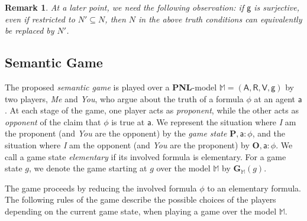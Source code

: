 \documentclass{easychair}
\newcommand{\I}{\emph{I}\xspace}
\newcommand{\You}{\emph{You}\xspace}
\newcommand{\Me}{\emph{Me}\xspace}
\newcommand{\M}{\mathbb{M}}
\newcommand{\A}{\mathsf{A}}
\newcommand{\R}{\mathsf{R}}
\newcommand{\V}{\mathsf{V}}
\newcommand{\g}{\mathsf{g}}
\newcommand{\ag}{\mathsf{a}}
\newtheorem{remark}{Remark}
\newcommand{\PNL}{\textbf{PNL}}
\begin{document}
\begin{remark}\label{rem:surjg}
At a later point, we need the following observation: if $\g$ is surjective, even
if restricted to $N'\subseteq N$, then  $N$ in the above truth conditions
can equivalently be replaced by $N'$. \end{remark}

 

\subsection{Semantic Game}\label{sec:game-semantics}
The proposed \emph{semantic game} is played over a \PNL-model $\M=(\A,\R,\V,\g)$ by two
players, \Me and \You, who argue about the truth of a formula $\phi$ at an
agent $\ag$. At each stage of the game, one player acts as \emph{proponent}, while the
other acts as \emph{opponent} of the claim that  $\phi$ is true at 
$\ag$. We represent the situation where \I am the proponent (and \You are the
opponent) by the \emph{game state} $\mathbf{P}, \ag:\phi$, and the situation
where \I am the opponent (and \You are the proponent) by $\mathbf{O},
\ag:\phi$. We call a game state \emph{elementary} if its involved formula is
elementary. For a game state $g$, we denote the game starting at $g$ over the
model $\M$ by $\mathbf{G}_\M(g)$.

The game proceeds by reducing the involved formula $\phi$ to an elementary formula. The following rules of the game describe the possible choices of the players depending on the current game state,
when playing a game over the model $\M$.
\end{document}
